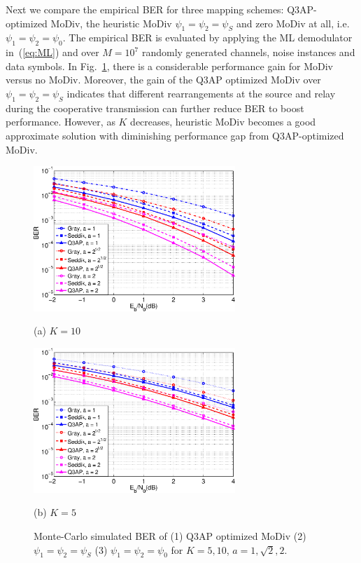 \documentclass[journal,draftcls,onecolumn,12pt,twoside]{IEEEtran}
\begin{document}
Next we compare the empirical BER for three mapping schemes: Q3AP-optimized
MoDiv, the heuristic MoDiv $\psi_1 = \psi_2 = \psi_S$  and zero MoDiv at all,
i.e. $\psi_1 = \psi_2 = \psi_0$. The empirical BER is evaluated by applying the
ML demodulator in~(\ref{eq:ML}) and over $M=10^7$ randomly generated channels, 
noise instances and data symbols. In Fig.~\ref{fig:montecarlo}, there is a
considerable performance gain for MoDiv versus no MoDiv. Moreover, the gain of
the Q3AP optimized MoDiv over $\psi_1 = \psi_2 = \psi_S$ indicates that
different rearrangements at the source and relay during the cooperative
transmission can further reduce BER to boost performance. However, as $K$
decreases, heuristic MoDiv becomes a good approximate solution with diminishing
performance gap from Q3AP-optimized MoDiv.

\begin{figure}[!t]
    \begin{minipage}[b]{0.49\linewidth}
      \centering
      \centerline{\includegraphics[width=3.0in]{./figs/MC_10.eps}}
      \centerline{(a) $ K = 10$}\medskip
    \end{minipage}
    \hfill
    \begin{minipage}[b]{0.49\linewidth}
      \centering
      \centerline{\includegraphics[width=3.0in]{./figs/MC_5.eps}}
      \centerline{(b) $K=5$}\medskip
    \end{minipage}
    \caption{Monte-Carlo simulated BER of (1) Q3AP optimized MoDiv
    (2) $\psi_1 = \psi_2 = \psi_S$ (3) $\psi_1 = \psi_2 = \psi_0$ for $K = 5,
    10$, $a = 1, \sqrt{2}, 2$.}
    \label{fig:montecarlo}
\end{figure}
\end{document}
